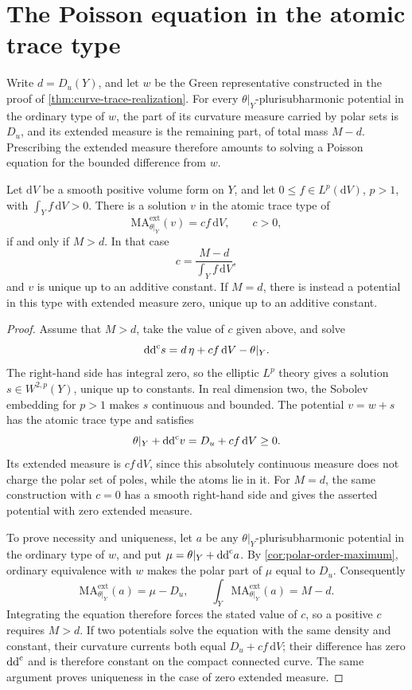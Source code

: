 \section{The Poisson equation in the atomic trace type}

Write $d=D_u(Y)$, and let $w$ be the Green representative constructed in the proof of \cref{thm:curve-trace-realization}. For every $\theta|_Y$-plurisubharmonic potential in the ordinary type of $w$, the part of its curvature measure carried by polar sets is $D_u$, and its extended measure is the remaining part, of total mass $M-d$. Prescribing the extended measure therefore amounts to solving a Poisson equation for the bounded difference from $w$.

\begin{theorem}\label{thm:curve-atomic-lp-equation}
Let $\mathrm{d}V$ be a smooth positive volume form on $Y$, and let $0\leq f\in L^p(\mathrm{d}V)$, $p>1$, with $\int_Yf\,\mathrm{d}V>0$.
There is a solution $v$ in the atomic trace type of
\[
 \mathrm{MA}^{\mathrm{ext}}_{\theta|_Y}(v)=c f\,\mathrm{d}V,
 \qquad c>0,
\]
if and only if $M>d$. In that case
\[
 c=\frac{M-d}{\int_Yf\,\mathrm{d}V},
\]
and $v$ is unique up to an additive constant. If $M=d$, there is instead a potential in this type with extended measure zero, unique up to an additive constant.
\end{theorem}
\begin{proof}
Assume that $M>d$, take the value of $c$ given above, and solve
\[
 \mathrm{dd}^{\mathrm{c}} s=d\,\eta+c f\,\mathrm{d}V-\theta|_Y.
\]
The right-hand side has integral zero, so the elliptic $L^p$ theory gives a solution $s\in W^{2,p}(Y)$, unique up to constants. In real dimension two, the Sobolev embedding for $p>1$ makes $s$ continuous and bounded. The potential $v=w+s$ has the atomic trace type and satisfies
\[
 \theta|_Y+\mathrm{dd}^{\mathrm{c}} v=D_u+c f\,\mathrm{d}V\geq0.
\]
Its extended measure is $c f\,\mathrm{d}V$, since this absolutely continuous measure does not charge the polar set of poles, while the atoms lie in it. For $M=d$, the same construction with $c=0$ has a smooth right-hand side and gives the asserted potential with zero extended measure.

To prove necessity and uniqueness, let $a$ be any $\theta|_Y$-plurisubharmonic potential in the ordinary type of $w$, and put $\mu=\theta|_Y+\mathrm{dd}^{\mathrm{c}} a$. By \cref{cor:polar-order-maximum}, ordinary equivalence with $w$ makes the polar part of $\mu$ equal to $D_u$. Consequently
\[
 \mathrm{MA}^{\mathrm{ext}}_{\theta|_Y}(a)=\mu-D_u,
 \qquad
 \int_Y\mathrm{MA}^{\mathrm{ext}}_{\theta|_Y}(a)=M-d.
\]
Integrating the equation therefore forces the stated value of $c$, so a positive $c$ requires $M>d$. If two potentials solve the equation with the same density and constant, their curvature currents both equal $D_u+c f\,\mathrm{d}V$; their difference has zero $\mathrm{dd}^{\mathrm{c}}$ and is therefore constant on the compact connected curve. The same argument proves uniqueness in the case of zero extended measure.
\end{proof}












